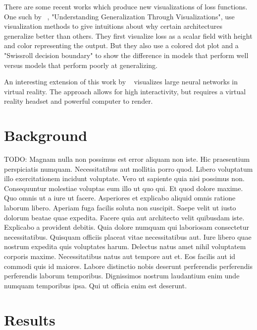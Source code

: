 \documentclass{acmsiggraph}
\begin{document}
There are some recent works which produce new visualizations of loss functions. One such by ~\cite{pmlr-v137-huang20a}, "Understanding Generalization Through Visualizations", use
visualization methods to give intuitions about why certain architectures generalize better than others. They first visualize loss as a scalar field with height and color representing the output. But they also use a colored dot plot and a "Swissroll decision boundary" to show the difference in models that perform well versus models that perform poorly at generalizing.

An interesting extension of this work by ~\cite{linse2022walk} visualizes large neural networks in virtual reality. The approach allows for high interactivity, but requires a virtual reality headset and powerful computer to render.


\section{Background}
\label{sec:intro}

TODO:
Magnam nulla non possimus est error aliquam non iste. Hic praesentium perspiciatis numquam. Necessitatibus aut mollitia porro quod. Libero voluptatum illo exercitationem incidunt voluptate. Vero ut sapiente quia nisi possimus non. Consequuntur molestiae voluptas eum illo ut quo qui.
Et quod dolore maxime. Quo omnis ut a iure ut facere. Asperiores et explicabo aliquid omnis ratione laborum libero. Aperiam fuga facilis soluta non suscipit.
Saepe velit ut iusto dolorum beatae quae expedita. Facere quia aut architecto velit quibusdam iste. Explicabo a provident debitis. Quia dolore numquam qui laboriosam consectetur necessitatibus.
Quisquam officiis placeat vitae necessitatibus aut. Iure libero quae nostrum expedita quis voluptates harum. Delectus natus amet nihil voluptatem corporis maxime. Necessitatibus natus aut tempore aut et.
Eos facilis aut id commodi quis id maiores. Labore distinctio nobis deserunt perferendis perferendis perferendis laborum temporibus. Dignissimos nostrum laudantium enim unde numquam temporibus ipsa. Qui ut officia enim est deserunt.


\section{Results}
\label{sec:intro}
\end{document}
